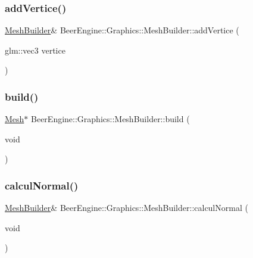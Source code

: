 \subsubsection{\texorpdfstring{add\+Vertice()}{addVertice()}}
{\footnotesize\ttfamily \mbox{\hyperlink{class_beer_engine_1_1_graphics_1_1_mesh_builder}{Mesh\+Builder}}\& Beer\+Engine\+::\+Graphics\+::\+Mesh\+Builder\+::add\+Vertice (\begin{DoxyParamCaption}\item[{glm\+::vec3}]{vertice }\end{DoxyParamCaption})}

\mbox{\label{class_beer_engine_1_1_graphics_1_1_mesh_builder_a0a5704934acb9b6b2f5ffbdd01ae4c8b}} 
\subsubsection{\texorpdfstring{build()}{build()}}
{\footnotesize\ttfamily \mbox{\hyperlink{class_beer_engine_1_1_graphics_1_1_mesh}{Mesh}}$\ast$ Beer\+Engine\+::\+Graphics\+::\+Mesh\+Builder\+::build (\begin{DoxyParamCaption}\item[{void}]{ }\end{DoxyParamCaption})}

\mbox{\label{class_beer_engine_1_1_graphics_1_1_mesh_builder_a65981a84e64924a36bc208614844e34b}} 
\subsubsection{\texorpdfstring{calcul\+Normal()}{calculNormal()}}
{\footnotesize\ttfamily \mbox{\hyperlink{class_beer_engine_1_1_graphics_1_1_mesh_builder}{Mesh\+Builder}}\& Beer\+Engine\+::\+Graphics\+::\+Mesh\+Builder\+::calcul\+Normal (\begin{DoxyParamCaption}\item[{void}]{ }\end{DoxyParamCaption})}

